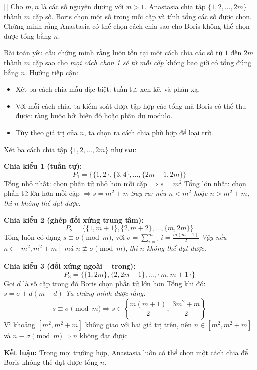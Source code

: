 \documentclass[../08-quadratic-residues.tex]{subfiles}
\begin{document}
\begin{example*}\label{example:EGMO-2015-P5}\textbf{[]}
    Cho \( m, n \) là các số nguyên dương với \( m > 1 \). Anastasia chia tập \( \{1, 2, \dots, 2m\} \) thành \( m \) cặp số.
    Boris chọn một số trong mỗi cặp và tính tổng các số được chọn.
    Chứng minh rằng Anastasia có thể chọn cách chia sao cho Boris không thể chọn được tổng bằng \( n \).
\end{example*}

\begin{story*}
    Bài toán yêu cầu chứng minh rằng luôn tồn tại một cách chia các số từ \( 1 \) đến \( 2m \) thành \( m \) cặp sao cho \textit{mọi cách chọn 1 số từ mỗi cặp} không bao giờ có tổng đúng bằng \( n \). Hướng tiếp cận:
    \begin{itemize}[topsep=0pt, partopsep=0pt, itemsep=0pt]
        \item Xét ba cách chia mẫu đặc biệt: tuần tự, xen kẽ, và phản xạ.
        \item Với mỗi cách chia, ta kiểm soát được tập hợp các tổng mà Boris có thể thu được: ràng buộc bởi biên độ hoặc phần dư modulo.
        \item Tùy theo giá trị của \( n \), ta chọn ra cách chia phù hợp để loại trừ.
    \end{itemize}
\end{story*}

\begin{soln}\footnotemark
    Xét ba cách chia tập \( \{1, 2, \dots, 2m\} \) như sau:

    \textbf{Chia kiểu 1 (tuần tự):}
    \[
        P_1 = \{ \{1,2\}, \{3,4\}, \dots, \{2m - 1, 2m\} \}
    \]
    Tổng nhỏ nhất: chọn phần tử nhỏ hơn mỗi cặp \( \Rightarrow s = m^2 \)  
    Tổng lớn nhất: chọn phần tử lớn hơn mỗi cặp \( \Rightarrow s = m^2 + m \)  
    \textit{Suy ra: nếu \( n < m^2 \) hoặc \( n > m^2 + m \), thì \( n \) không thể đạt được.}

    \textbf{Chia kiểu 2 (ghép đối xứng trung tâm):}
    \[
        P_2 = \{ \{1, m+1\}, \{2, m+2\}, \dots, \{m, 2m\} \}
    \]
    Tổng luôn có dạng \( s \equiv \sigma \pmod{m} \), với \( \sigma = \sum_{i=1}^{m} i = \frac{m(m+1)}{2} \)  
    \textit{Vậy nếu \( n \in [m^2, m^2 + m] \) mà \( n \not\equiv \sigma \pmod{m} \), thì \( n \) không thể đạt được.}

    \textbf{Chia kiểu 3 (đối xứng ngoài – trong):}
    \[
        P_3 = \{ \{1, 2m\}, \{2, 2m - 1\}, \dots, \{m, m+1\} \}
    \]
    Gọi \( d \) là số cặp trong đó Boris chọn phần tử lớn hơn  
    Tổng khi đó: \( s = \sigma + d(m - d) \)  
    \textit{Ta chứng minh được rằng:}  
    \[
        s \equiv \sigma \pmod{m} \Rightarrow s \in \left\{ \frac{m(m+1)}{2}, \; \frac{3m^2 + m}{2} \right\}
    \]
    Vì khoảng \( [m^2, m^2 + m] \) không giao với hai giá trị trên, nên \( n \in [m^2, m^2 + m] \) và \( n \equiv \sigma \pmod{m} \Rightarrow n \) không đạt được.

    \textbf{Kết luận:} Trong mọi trường hợp, Anastasia luôn có thể chọn một cách chia để Boris không thể đạt được tổng \( n \).
\end{soln}

\end{document}
